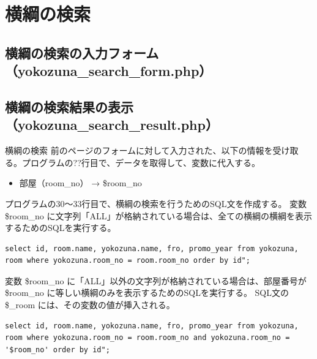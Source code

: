 \documentclass[10pt,a4paper,titlepage]{jreport}
\begin{document}
\clearpage

\section{横綱の検索}


\subsection{横綱の検索の入力フォーム（yokozuna\_search\_form.php）}



\subsection{横綱の検索結果の表示（yokozuna\_search\_result.php）}



横綱の検索
前のページのフォームに対して入力された、以下の情報を受け取る。プログラムの??行目で、データを取得して、変数に代入する。

\begin{itemize}
\item 部屋（room\_no） → \$room\_no
\end{itemize}

プログラムの30～33行目で、横綱の検索を行うためのSQL文を作成する。
変数 \$room\_no に文字列「ALL」が格納されている場合は、全ての横綱の横綱を表示するためのSQLを実行する。

\begin{lstlisting}[caption=全ての横綱を表示するためのSQL]
select id, room.name, yokozuna.name, fro, promo_year from yokozuna, room where yokozuna.room_no = room.room_no order by id";
\end{lstlisting}
\vspace{3mm}

変数 \$room\_no に「ALL」以外の文字列が格納されている場合は、部屋番号が \$room\_no に等しい横綱のみを表示するためのSQLを実行する。
SQL文の \$\_room には、その変数の値が挿入される。

\begin{lstlisting}[caption=指定された部屋番号に所属する横綱を検索するためのSQL]
select id, room.name, yokozuna.name, fro, promo_year from yokozuna, room where yokozuna.room_no = room.room_no and yokozuna.room_no = '$room_no' order by id";
\end{lstlisting}
\vspace{3mm}
\end{document}
